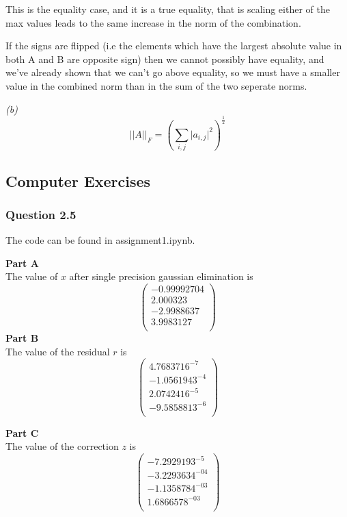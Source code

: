 \documentclass{article}
\begin{document}
This is the equality case, and it is a true equality, that is scaling either
of the max values leads to the same increase in the norm of the combination.

If the signs are flipped (i.e the elements which have the largest absolute value in
both A and B are opposite sign) then we cannot possibly have equality, and we've
already shown that we can't go above equality, so we must have a smaller value in
the combined norm than in the sum of the two seperate norms.


\textit{(b)}
$$ \lvert \lvert A\rvert \rvert_{F} = \left( \sum_{i,j}\lvert a_{i,j} \rvert^{2} \right)^{\frac{1}{2}} $$



\subsection{Computer Exercises}
\subsubsection{Question 2.5}
The code can be found in assignment1.ipynb.

\textbf{Part A}\\
The value of $x$ after single precision gaussian elimination is
$$\left( \begin{smallmatrix}-0.99992704\\
 2.000323\\
 -2.9988637\\
 3.9983127\\
 \end{smallmatrix}
 \right)
$$
\textbf{Part B}\\
The value of the residual $r$ is
$$\left( \begin{smallmatrix}4.7683716^{-7}\\
 -1.0561943^{-4}\\
 2.0742416^{-5}\\
 -9.5858813^{-6}\\
 \end{smallmatrix}
 \right)
$$

\textbf{Part C}\\
The value of the correction $z$ is
$$\left( \begin{smallmatrix}
-7.2929193^{-5}\\
-3.2293634^{-04}\\
-1.1358784^{-03}\\
 1.6866578^{-03}\\
 \end{smallmatrix}
 \right)
$$
\end{document}
